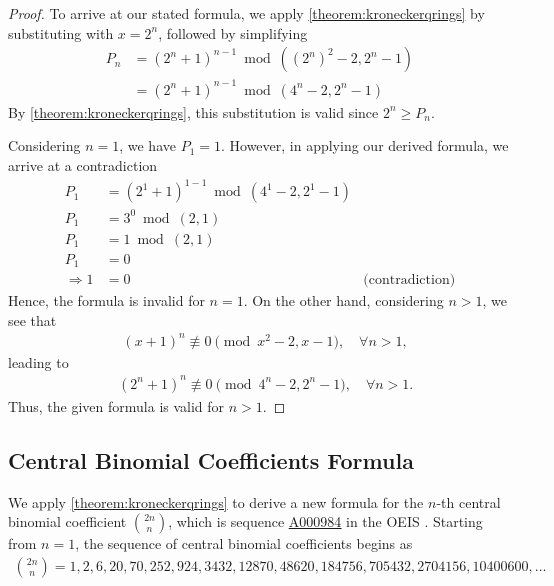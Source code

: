 \documentclass[12pt,reqno]{article}
\theoremstyle{plain}
\theoremstyle{definition}
\newcommand{\seqnum}[1]{\href{https://oeis.org/#1}{\rm \underline{#1}}}
\begin{document}
\begin{proof}
To arrive at our stated formula, we apply \cref{theorem:kroneckerqrings} by substituting with $x = 2^n$, followed by simplifying
\begin{align*}
     P_n &= (2^n+1)^{n-1} \bmod{((2^n)^2-2, 2^n-1)} \\
     &= (2^n+1)^{n-1} \bmod{(4^n-2, 2^n-1)}
\end{align*}
By \cref{theorem:kroneckerqrings}, this substitution is valid since $2^n \geq P_n$.

Considering $n = 1$, we have $P_1 = 1$. However, in applying our derived formula, we arrive at a contradiction
\begin{align*}
     P_1 &= (2^1+1)^{1-1} \bmod{(4^1-2, 2^1-1)} & \\ 
     P_1 &= 3^{0} \bmod{(2, 1)} & \\
     P_1 &= 1 \bmod{(2, 1)} & \\
     P_1 &= 0 & \\
     \Rightarrow 1 &= 0 & \text{(contradiction)}
\end{align*}
Hence, the formula is invalid for $n=1$. On the other hand, considering $n > 1$, we see that
\begin{align*}
     & (x+1)^n \not\equiv 0 \pmod{x^2-2, x-1}, \quad \forall n > 1 ,
\end{align*}
leading to
\begin{align*}
    & (2^n+1)^n \not\equiv 0 \pmod{4^n-2, 2^n-1}, \quad \forall n > 1 .
\end{align*}
Thus, the given formula is valid for $n > 1$.
\end{proof}

\subsection{Central Binomial Coefficients Formula}
We apply \cref{theorem:kroneckerqrings} to derive a new formula for the $n$-th central binomial coefficient $\binom{2n}{n}$, which is sequence \seqnum{A000984} in the OEIS \cite{A000984}. Starting from $n=1$, the sequence of central binomial coefficients begins as
\begin{align*}
    \binom{2n}{n} = 1, 2, 6, 20, 70, 252, 924, 3432, 12870, 48620, 184756, 705432, 2704156, 10400600, \ldots
\end{align*}
\end{document}
